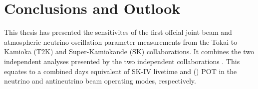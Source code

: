 \chapter{Conclusions and Outlook}

This thesis has presented the sensitivites of the first offcial joint beam and atmospheric neutrino oscillation parameter measurements from the Tokai-to-Kamioka (T2K) and Super-Kamiokande (SK) collaborations. It combines the two independent analyses presented by the two independent collaborations . This equates to a combined  days equivalent of SK-IV livetime and () POT in the neutrino and antineutrino beam operating modes, respectively. 
